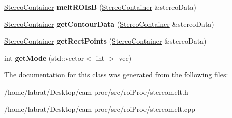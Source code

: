 \begin{DoxyCompactItemize}
\item 
\hyperlink{structStereoContainer}{Stereo\+Container} {\bfseries melt\+R\+O\+IsB} (\hyperlink{structStereoContainer}{Stereo\+Container} \&stereo\+Data)\hypertarget{classStereoMelt_aa35558c285e2d06a5b31fd58aabc066b}{}\label{classStereoMelt_aa35558c285e2d06a5b31fd58aabc066b}

\item 
\hyperlink{structStereoContainer}{Stereo\+Container} {\bfseries get\+Contour\+Data} (\hyperlink{structStereoContainer}{Stereo\+Container} \&stereo\+Data)\hypertarget{classStereoMelt_a9aece571876db5e91c2bfb2012f20545}{}\label{classStereoMelt_a9aece571876db5e91c2bfb2012f20545}

\item 
\hyperlink{structStereoContainer}{Stereo\+Container} {\bfseries get\+Rect\+Points} (\hyperlink{structStereoContainer}{Stereo\+Container} \&stereo\+Data)\hypertarget{classStereoMelt_abe72fb607ed373a1eed556364e07266c}{}\label{classStereoMelt_abe72fb607ed373a1eed556364e07266c}

\item 
int {\bfseries get\+Mode} (std\+::vector$<$ int $>$ vec)\hypertarget{classStereoMelt_af4a83d16fef4585a14ea687bbe4fe19f}{}\label{classStereoMelt_af4a83d16fef4585a14ea687bbe4fe19f}

\end{DoxyCompactItemize}


The documentation for this class was generated from the following files\+:\begin{DoxyCompactItemize}
\item 
/home/labrat/\+Desktop/cam-\/proc/src/roi\+Proc/stereomelt.\+h\item 
/home/labrat/\+Desktop/cam-\/proc/src/roi\+Proc/stereomelt.\+cpp\end{DoxyCompactItemize}
